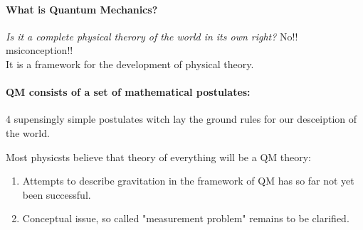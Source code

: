 \documentclass[]{article}
\theoremstyle{nonumberplain}
\begin{document}
\paragraph{\textbf{What is Quantum Mechanics?}}%
\begin{center}
	\textit{Is it a complete physical therory of the world in its own right? } No!! msiconception!!\\
	It is a framework for the development of physical theory.
\end{center}

\paragraph{\textbf{QM consists of a set of mathematical postulates:\\}}%
\label{par:qm_consists_of_a_set_of_mathematical_postulates_}
\begin{center}
4 supensingly simple postulates witch lay the ground rules for our desceiption of the world.\\
\end{center}
Most physicsts believe that theory of everything will be a QM theory:
\begin{enumerate}
	\item Attempts to describe gravitation in the framework of QM has so far not yet been successful.
	\item Conceptual issue, so called "measurement problem" remains to be clarified.
\end{enumerate}
\end{document}
